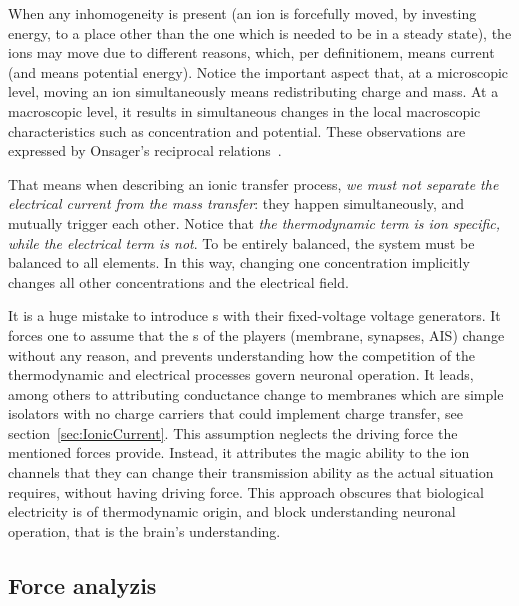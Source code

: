When any inhomogeneity is present (an ion is forcefully moved, by investing energy, to a place other than the one which is needed to be in a steady state), the ions may move due to different reasons, which, per definitionem, means current (and means potential energy).
Notice the important aspect that, at a microscopic level, moving an ion simultaneously
means redistributing charge and mass. At a macroscopic level, it results in simultaneous changes in the local macroscopic characteristics such as concentration and potential. These observations are expressed by
Onsager's reciprocal relations~\cite{OnsagerExperimental:1959}.
\else

\fi



\ifx\magyar\undefined
That means when describing an ionic transfer process, \textit{we must not separate the electrical current from the mass transfer}: they happen simultaneously, and mutually trigger each other.
Notice that \textit{the thermodynamic term is ion specific, while the electrical term is not}. To be entirely balanced, the system must be balanced to all elements.
In this way, changing one concentration implicitly changes all other concentrations and the electrical field.

It is a huge mistake to introduce s with their fixed-voltage voltage generators. It forces one to assume that the
s of the players (membrane, synapses, \gls{AIS}) 
change 
without any reason, and prevents understanding how the competition of the thermodynamic and electrical processes govern neuronal operation.
It leads, among others to attributing conductance change to membranes  which are simple isolators with no charge carriers that could implement
charge transfer, see section~\ref{sec:IonicCurrent}.
This assumption neglects the driving force the mentioned forces provide. 
Instead, it attributes the magic ability to the ion channels that they
can change their transmission ability as the actual situation requires, without having driving force.
This approach obscures that biological electricity is of 
thermodynamic origin, and block understanding neuronal operation,
that is the brain's understanding.
\else

\fi

\ifx\magyar\undefined
\subsection{Force analyzis\label{sec:Physics-MembraneForces}}


